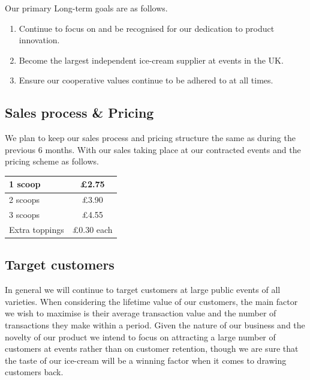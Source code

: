 \documentclass{article}
\begin{document}
  Our primary Long-term goals are as follows.
  \begin{enumerate}

    \item Continue to focus on and be recognised for our dedication to product innovation.

    \item Become the largest independent ice-cream supplier at events in the UK.

    \item Ensure our cooperative values continue to be adhered to at all times.
  \end{enumerate}

  \subsection{Sales process \& Pricing}

  We plan to keep our sales process and pricing structure the same as during the previous 6 months. With our sales taking place at our contracted events and the pricing scheme as follows.

\begin{center}
  \begin{tabular}{ | l | c | }
    \hline
    1 scoop & £2.75 \\[2ex] \hline
    2 scoops & £3.90 \\[2ex] \hline
    3 scoops & £4.55 \\[2ex] \hline
    Extra toppings & £0.30 each \\[2ex] \hline
  \end{tabular}
\end{center}

  \subsection{Target customers}

  In general we will continue to target customers at large public events of all varieties. When considering the lifetime value of our customers, the main factor we wish to maximise is their average transaction value and the number of transactions they make within a period. Given the nature of our business and the novelty of our product we intend to focus on attracting a large number of customers at events rather than on customer retention, though we are sure that the taste of our ice-cream will be a winning factor when it comes to drawing customers back. \\
\end{document}
